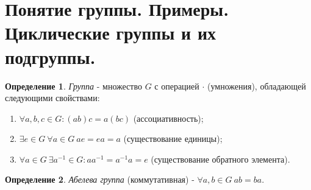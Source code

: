 \documentclass[11pt,a4paper]{report}
\theoremstyle{definition}
\theoremstyle{definition}
\theoremstyle{definition}
\newtheorem{definition}{Определение}[section]
\begin{document}
  \tableofcontents
  \newpage
  \section{Понятие группы. Примеры. Циклические группы и их подгруппы.}
  \begin{definition}\label{group_def}
  {\it Группа} - множество $G$ с операцией $\cdot$ (умножения), обладающей следующими свойствами:
 		\begin{enumerate}
	 		\item{$\forall a, b, c \in G: (ab)c = a(bc)$ (ассоциативность);}
 			\item{$\exists e \in G~ \forall a \in G~ ae=ea=a$ (существование единицы);}
 			\item{$\forall a \in G ~\exists a^{-1}\in G:aa^{-1}=a^{-1}a=e$ (существование обратного элемента).}
 		\end{enumerate}
  \end{definition}
  \begin{definition}\label{abelian_group_def}
  	{\it Абелева группа} (коммутативная) - $\forall a, b \in G~ab=ba$.
  \end{definition}
  
\end{document}
